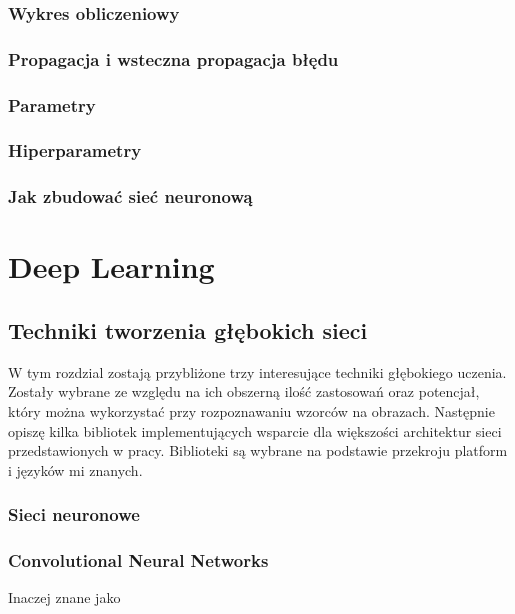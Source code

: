 \documentclass[12pt,a4paper,twoside,titlepage,openright]{book}
\begin{document}
\subsection{Wykres obliczeniowy}
\subsection{Propagacja i wsteczna propagacja błędu}
\subsection{Parametry}
\subsection{Hiperparametry}
\subsection{Jak zbudować sieć neuronową}


\chapter{Deep Learning}
\section{Techniki tworzenia głębokich sieci}
W tym rozdzial zostają przybliżone trzy interesujące techniki głębokiego uczenia. Zostały wybrane ze względu na ich obszerną ilość zastosowań oraz potencjał, który można wykorzystać przy rozpoznawaniu wzorców na obrazach. Następnie opiszę kilka bibliotek implementujących wsparcie dla większości architektur sieci przedstawionych w pracy. Biblioteki są wybrane na podstawie przekroju platform i języków mi znanych. 

\subsection{Sieci neuronowe}
\subsection{Convolutional Neural Networks}
Inaczej znane jako
\end{document}
